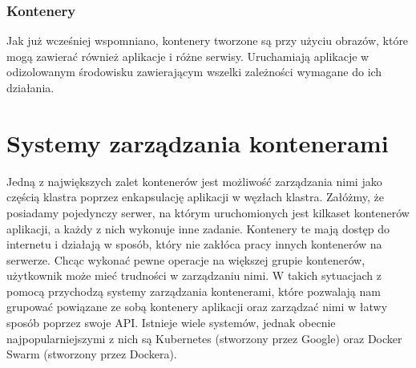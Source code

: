 \documentclass[12pt]{report}
\let\Oldsection\section
\renewcommand{\section}{\FloatBarrier\Oldsection}
\let\Oldsubsubsection\subsubsection
\renewcommand{\subsubsection}{\FloatBarrier\Oldsubsubsection}
\begin{document}
\subsubsection{Kontenery}
Jak już wcześniej wspomniano, kontenery tworzone są przy użyciu obrazów, które mogą zawierać również aplikacje i różne serwisy. Uruchamiają aplikacje w odizolowanym środowisku zawierającym wszelki zależności wymagane do ich działania. 

\section{Systemy zarządzania kontenerami}
Jedną z największych zalet kontenerów jest możliwość zarządzania nimi jako częścią klastra poprzez enkapsulację aplikacji w węzłach klastra. Załóżmy, że posiadamy pojedynczy serwer, na którym uruchomionych jest kilkaset kontenerów aplikacji, a każdy z nich wykonuje inne zadanie. Kontenery te mają dostęp do internetu i działają w sposób, który nie zakłóca pracy innych kontenerów na serwerze. Chcąc wykonać pewne operacje na większej grupie kontenerów, użytkownik może mieć trudności w zarządzaniu nimi. W takich sytuacjach z pomocą przychodzą systemy zarządzania kontenerami, które pozwalają nam grupować powiązane ze sobą kontenery aplikacji oraz zarządzać nimi w łatwy sposób poprzez swoje API. Istnieje wiele systemów, jednak obecnie najpopularniejszymi z nich są Kubernetes (stworzony przez Google) oraz Docker Swarm (stworzony przez Dockera).
\end{document}
